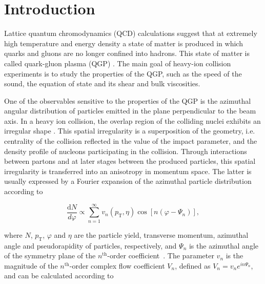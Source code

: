 \section{Introduction}
\label{Sec:Introduction}

Lattice quantum chromodynamics (QCD) calculations \cite{Borsanyi:2010cj,Bhattacharya:2014ara} suggest that at extremely high temperature and energy density a state of matter is produced in which quarks and gluons are no longer confined into hadrons. This state of matter is called quark-gluon plasma (QGP) \cite{Shuryak:1984nq, Cleymans:1985wb, Bass:1998vz}. The main goal of heavy-ion collision experiments is to study the properties of the QGP, such as the speed of the sound, the equation of state and its shear and bulk viscosities.

One of the observables sensitive to the properties of the QGP is the azimuthal angular distribution of particles emitted in the plane perpendicular to the beam axis. In a heavy ion collision, the overlap region of the colliding nuclei exhibits an irregular shape \cite{Bhalerao:2006tp, Alver:2008zza, Alver:2010gr, Alver:2010dn, Manly:2005zy}. This spatial irregularity is a superposition of the geometry, i.e. centrality of the collision reflected in the value of the impact parameter, and the density profile of nucleons participating in the collision. Through interactions between partons and at later stages between the produced particles, this spatial irregularity is transferred into an anisotropy in momentum space. The latter is usually expressed by a Fourier expansion of the azimuthal particle distribution \cite{Voloshin:1994mz,Poskanzer:1998yz} according to

\begin{equation}
\frac{\mathrm{d}N}{d\varphi} \propto \sum_{n=1}^{\infty} v_n(p_{\mathrm{T}},\eta) \cos[n(\varphi - \Psi_n)],
\label{Eq:Fourier}
\end{equation}



\noindent where $N$, $p_{\mathrm{T}}$, $\varphi$ and $\eta$ are the particle yield, transverse momentum, azimuthal angle and pseudorapidity of particles, respectively, and $\Psi_n$ is the azimuthal angle of the symmetry plane of the $n^{\mathrm{th}}$-order coefficient~\cite{Bhalerao:2006tp,Alver:2008zza,Alver:2010gr,Alver:2010dn}. The parameter $v_{n}$ is the magnitude of the $n^{\mathrm{th}}$-order complex flow coefficient $V_n$, defined as $V_{n} = v_{n}e^{in\Psi_n}$, and can be calculated according to 

